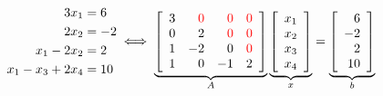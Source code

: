 \begin{equation}
\label{eq:LT03}
\begin{array}{cc}
   \begin{aligned}
     3 x_1 &=6 \\
     2 x_2 &= -2\\
    x_1 - 2 x_2 &= 2 \\
    x_1 - x_3 + 2 x_4 &= 10
    \end{aligned} \iff \underbrace{\left[\begin{array}{rrrr} 3 & \color{red} 0 & \color{red} 0 & \color{red} 0\\
0 & 2 & \color{red} 0 & \color{red} 0\\ 1 & -2& 0 & \color{red} 0 \\ 1 & 0 & -1 & 2  \end{array}\right]}_{A}  \underbrace{\left[\begin{array}{c} x_1 \\x_2 \\x_3 \\x_4\end{array} \right]}_{x}
= \underbrace{\left[\begin{array}{r} 6 \\-2 \\2 \\10\end{array} \right]}_{b}
    \end{array}
\end{equation}


